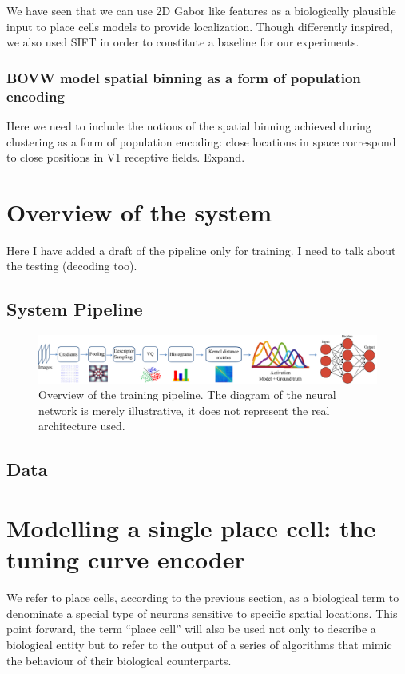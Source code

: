 We have seen that we can use 2D Gabor like features as a biologically plausible input to place cells models to provide localization. Though differently inspired, we also used SIFT in order to constitute a baseline for our experiments.

\subsubsection{BOVW model spatial binning as a form of population encoding}

Here we need to include the notions of the spatial binning achieved during clustering as a form of population encoding: close locations in space correspond to close positions in V1 receptive fields. Expand.

\section{Overview of the system}

Here I have added a draft of the pipeline only for training. I need to talk about the testing (decoding too).


\subsection{System Pipeline}

\begin{figure}[h]
\centering
\includegraphics[width=\linewidth]{./gfx/Chapter05//nn_pipeline.pdf}
\caption{Overview of the training pipeline. The diagram of the neural network is merely illustrative, it does not represent the real architecture used.}
\label{fig:pipeline}
\end{figure}

\subsection{Data}

\section{Modelling a single place cell: the tuning curve encoder}

We refer to place cells, according to the previous section, as a biological term to denominate a special type of neurons sensitive to specific spatial locations. This point forward, the term ``place cell'' will also be used not only to describe a biological entity but to refer to the output of a series of algorithms that mimic the behaviour of their biological counterparts.

